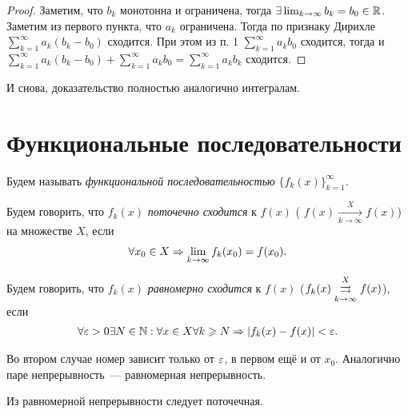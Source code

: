 \documentclass[../main.tex]{subfiles}
\begin{document}
\begin{proof}
  Заметим, что $b_k$ монотонна и ограничена, тогда $\exists \lim_{k \to \infty} b_k = b_0 \in \R$. Заметим из первого пункта, что $a_k$ ограничена. Тогда по признаку Дирихле $ \sum_{k=1}^{\infty} a_k (b_k - b_0)  $ сходится. При этом из п. 1 $ \sum_{k=1}^{\infty} a_k b_0  $ сходится, тогда и $ \sum_{k=1}^{\infty} a_k (b_k - b_0 ) + \sum_{k=1}^{\infty} a_k b_0 = \sum_{k=1}^{\infty} a_k b_k  $ сходится.
\end{proof}


\begin{note}
  И снова, доказательство полностью аналогично интегралам.
\end{note}

\section{Функциональные последовательности}

\begin{definition}
  Будем называть \emph{функциональной последовательностью} $ \{ f_{k}(x) \}_{k = 1}^{\infty} $.
\end{definition}


\begin{definition}
  Будем говорить, что $ f_k(x) $ \emph{поточечно сходится} к $ f(x) $ ( $ f(x)  \xrightarrow[k \to  \infty ]{X} f(x)$) на множестве $ X$, если 
  \begin{gather} 
     \forall x_0 \in X \hence \lim_{k \to \infty } f_k(x_0 ) = f(x_0 ).
  \end{gather}
\end{definition}


\begin{definition}
  Будем говорить, что $ f_k(x) $ \emph{равномерно сходится} к $ f(x) $ ($ f_k(x)  \convergesuniformly{k \to \infty}{X} f(x) $), если 
  \begin{gather} 
    \forall \eps > 0 \exists N \in \N : \forall x \in X \forall k \geq N \Rightarrow \left| f_k(x) - f(x)  \right| < \eps .
  \end{gather} 
\end{definition}


\begin{note}
  Во втором случае номер зависит только от $ \eps$, в первом ещё и от $ x_0 $. Аналогично паре непрерывность~--- равномерная непрерывность.
\end{note}

\begin{proposition}
  Из равномерной непрерывности следует поточечная.
\end{proposition}
\end{document}
